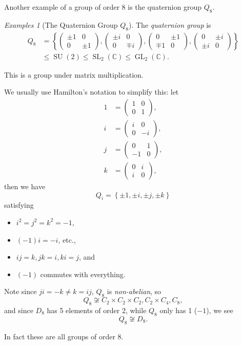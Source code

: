 \documentclass{article}
\theoremstyle{definition}
\theoremstyle{remark}
\newcommand{\pqty}[1]{\left(#1\right)}
\newcommand{\Bqty}[1]{\left\{#1\right\}}
\newcommand{\pmqty}[1]{\begin{pmatrix}#1\end{pmatrix}}
\newcommand{\CC}{\mathbb{C}}
\newcommand{\GL}{\operatorname{GL}}
\newcommand{\SL}{\operatorname{SL}}
\newtheorem*{examples*}{Examples}
\newcommand{\notisomorphic}{\not\cong}
\newcommand{\SU}{\operatorname{SU}}
\begin{document}
Another example of a group of order 8 is the quaternion group \(Q_8\).

\begin{examples*}[The Quaternion Group \(Q_8\)]
    The \emph{quaternion group} is
    \begin{align*}
        Q_8 &= \Bqty{
            \pmqty{\pm 1 & 0 \\ 0 & \pm 1},
            \pmqty{\pm i & 0 \\ 0 & \mp i},
            \pmqty{0 & \pm 1 \\ \mp 1 & 0},
            \pmqty{0 & \pm i \\ \pm i & 0}} \\
        &\leq \SU\pqty{2} \leq \SL_2\pqty{\CC} \leq \GL_2\pqty{\CC}.
    \end{align*}

    This is a group under matrix multiplication.

    We usually use Hamilton's notation to simplify this: let
    \begin{align*}
        1 &= \pmqty{1 & 0 \\ 0 & 1}, \\
        i &= \pmqty{i & 0 \\ 0 & -i},\\
        j &= \pmqty{0 & 1 \\ -1 & 0},\\
        k &= \pmqty{0 & i \\ i & 0},
    \end{align*}
    then we have
    \[
        Q_i = \Bqty{\pm 1, \pm i, \pm j, \pm k}
    \]
    satisfying
    \begin{itemize}
        \item \(i^2 = j^2 = k^2 = -1\),
        \item \(\pqty{-1} i = -i\), etc.,
        \item \(ij = k, jk = i, ki = j\), and
        \item \(\pqty{-1}\) commutes with everything.
    \end{itemize}
\end{examples*}

Note since \(ji = -k \neq k = ij\), \(Q_8\) is \emph{non-abelian}, so
\[
    Q_8 \notisomorphic C_2 \times C_2 \times C_2, C_2 \times C_4, C_8,
\]
and since \(D_8\) has 5 elements of order 2, while \(Q_8\) only has 1 (\(-1\)), we see
\[
    Q_8 \notisomorphic D_8.
\]

In fact these are all groups of order 8.
\end{document}
